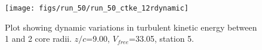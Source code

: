 \begin{figure}[H]
\centering
\texttt{[image: figs/run\_50/run\_50\_ctke\_12rdynamic]}
\caption{Plot showing dynamic variations in turbulent kinetic energy between 1 and 2 core radii. $z/c$=9.00, $V_{free}$=33.05, station 5.}
\label{fig:run_50_ctke_12rdynamic}
\end{figure}


